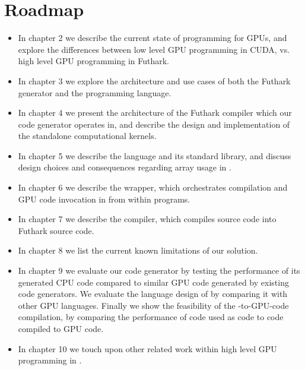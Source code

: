 \section{Roadmap}
\begin{itemize}
\item In chapter 2 we describe the current state of programming for GPUs, and
  explore the differences between low level GPU programming in CUDA, vs. high
  level GPU programming in Futhark.

\item In chapter 3 we explore the architecture and use cases of both the Futhark
  \csharp{} generator and the \fshark{} programming language.
  
\item In chapter 4 we present the architecture of the Futhark compiler which
  our \csharp{} code generator operates in, and describe the design and
  implementation of the standalone \csharp{} computational kernels.

\item In chapter 5 we describe the \fshark{} language and its standard library,
  and discuss design choices and consequences regarding array usage in
  \fshark{}.

\item In chapter 6 we describe the \fshark{} wrapper, which orchestrates
  \fshark{} compilation and GPU code invocation in from within \fsharp{} programs.
  
\item In chapter 7 we describe the \fshark{} compiler, which compiles \fshark{}
  source code into Futhark source code.
  
\item In chapter 8 we list the current known limitations of our solution.

\item In chapter 9 we evaluate our code generator by testing the performance of
  its generated CPU code compared to similar GPU code generated by existing code
  generators.
  We evaluate the language design of \fshark{} by comparing it with other GPU
  languages. Finally we show the feasibility of the \fsharp{}-to-GPU-code
  compilation, by comparing the performance of \fshark{} code used as \fsharp{}
  code to \fshark{} code compiled to GPU code.

\item In chapter 10 we touch upon other related work within high level GPU
  programming in \fsharp{}.
\end{itemize}

